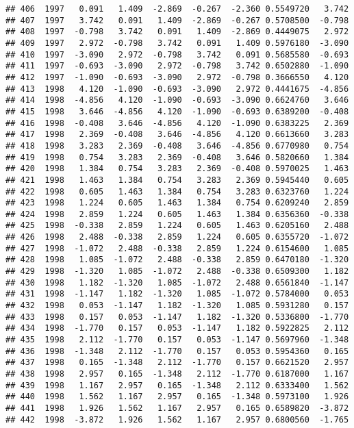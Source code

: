 \documentclass[]{article}
\begin{document}
\begin{verbatim}
## 406  1997   0.091   1.409  -2.869  -0.267  -2.360 0.5549720   3.742
## 407  1997   3.742   0.091   1.409  -2.869  -0.267 0.5708500  -0.798
## 408  1997  -0.798   3.742   0.091   1.409  -2.869 0.4449075   2.972
## 409  1997   2.972  -0.798   3.742   0.091   1.409 0.5976180  -3.090
## 410  1997  -3.090   2.972  -0.798   3.742   0.091 0.5685580  -0.693
## 411  1997  -0.693  -3.090   2.972  -0.798   3.742 0.6502880  -1.090
## 412  1997  -1.090  -0.693  -3.090   2.972  -0.798 0.3666550   4.120
## 413  1998   4.120  -1.090  -0.693  -3.090   2.972 0.4441675  -4.856
## 414  1998  -4.856   4.120  -1.090  -0.693  -3.090 0.6624760   3.646
## 415  1998   3.646  -4.856   4.120  -1.090  -0.693 0.6389200  -0.408
## 416  1998  -0.408   3.646  -4.856   4.120  -1.090 0.6383225   2.369
## 417  1998   2.369  -0.408   3.646  -4.856   4.120 0.6613660   3.283
## 418  1998   3.283   2.369  -0.408   3.646  -4.856 0.6770980   0.754
## 419  1998   0.754   3.283   2.369  -0.408   3.646 0.5820660   1.384
## 420  1998   1.384   0.754   3.283   2.369  -0.408 0.5970025   1.463
## 421  1998   1.463   1.384   0.754   3.283   2.369 0.5945440   0.605
## 422  1998   0.605   1.463   1.384   0.754   3.283 0.6323760   1.224
## 423  1998   1.224   0.605   1.463   1.384   0.754 0.6209240   2.859
## 424  1998   2.859   1.224   0.605   1.463   1.384 0.6356360  -0.338
## 425  1998  -0.338   2.859   1.224   0.605   1.463 0.6205160   2.488
## 426  1998   2.488  -0.338   2.859   1.224   0.605 0.6355720  -1.072
## 427  1998  -1.072   2.488  -0.338   2.859   1.224 0.6154600   1.085
## 428  1998   1.085  -1.072   2.488  -0.338   2.859 0.6470180  -1.320
## 429  1998  -1.320   1.085  -1.072   2.488  -0.338 0.6509300   1.182
## 430  1998   1.182  -1.320   1.085  -1.072   2.488 0.6561840  -1.147
## 431  1998  -1.147   1.182  -1.320   1.085  -1.072 0.5784000   0.053
## 432  1998   0.053  -1.147   1.182  -1.320   1.085 0.5931280   0.157
## 433  1998   0.157   0.053  -1.147   1.182  -1.320 0.5336800  -1.770
## 434  1998  -1.770   0.157   0.053  -1.147   1.182 0.5922825   2.112
## 435  1998   2.112  -1.770   0.157   0.053  -1.147 0.5697960  -1.348
## 436  1998  -1.348   2.112  -1.770   0.157   0.053 0.5954360   0.165
## 437  1998   0.165  -1.348   2.112  -1.770   0.157 0.6621520   2.957
## 438  1998   2.957   0.165  -1.348   2.112  -1.770 0.6187000   1.167
## 439  1998   1.167   2.957   0.165  -1.348   2.112 0.6333400   1.562
## 440  1998   1.562   1.167   2.957   0.165  -1.348 0.5973100   1.926
## 441  1998   1.926   1.562   1.167   2.957   0.165 0.6589820  -3.872
## 442  1998  -3.872   1.926   1.562   1.167   2.957 0.6800560  -1.765

\end{verbatim}
\end{document}
